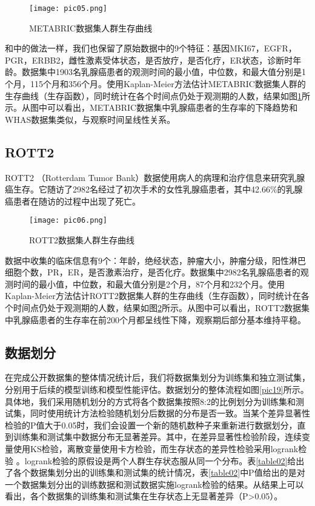 \begin{figure}[H]
\texttt{[image: pic05.png]}
\caption{METABRIC数据集人群生存曲线}
\label{pic05}
\end{figure}

和\cite{Katzman2018DeepSurv}中的做法一样，我们也保留了原始数据中的9个特征：基因MKI67，EGFR，PGR，ERBB2，雌性激素受体状态，是否放疗，是否化疗，ER状态，诊断时年龄。数据集中1903名乳腺癌患者的观测时间的最小值，中位数，和最大值分别是1个月，115个月和356个月。使用Kaplan-Meier方法估计METABRIC数据集人群的生存曲线（生存函数），同时统计在各个时间点仍处于观测期的人数，结果如图\ref{pic05}所示。从图中可以看出，METABRIC数据集中乳腺癌患者的生存率的下降趋势和WHAS数据集类似，与观察时间呈线性关系。

\subsection{ROTT2}

ROTT2 （Rotterdam Tumor Bank）数据使用病人的病理和治疗信息来研究乳腺癌生存。它随访了2982名经过了初次手术的女性乳腺癌患者，其中42.66\%的乳腺癌患者在随访的过程中出现了死亡。

\begin{figure}[H]
\texttt{[image: pic06.png]}
\caption{ROTT2数据集人群生存曲线}
\label{pic06}
\end{figure}

数据中收集的临床信息有9个：年龄，绝经状态，肿瘤大小，肿瘤分级，阳性淋巴细胞个数，PR，ER，是否激素治疗，是否化疗。数据集中2982名乳腺癌患者的观测时间的最小值，中位数，和最大值分别是2个月，87个月和232个月。使用Kaplan-Meier方法估计ROTT2数据集人群的生存曲线（生存函数），同时统计在各个时间点仍处于观测期的人数，结果如图\ref{pic06}所示。从图中可以看出，ROTT2数据集中乳腺癌患者的生存率在前200个月都呈线性下降，观察期后部分基本维持平稳。

\subsection{数据划分}

在完成公开数据集的整体情况统计后，我们将数据集划分为训练集和独立测试集，分别用于后续的模型训练和模型性能评估。数据划分的整体流程如图\ref{pic19}所示。具体地，我们采用随机划分的方式将各个数据集按照8:2的比例划分为训练集和测试集，同时使用统计方法检验随机划分后数据的分布是否一致。当某个差异显著性检验的P值大于0.05时，我们会设置一个新的随机数种子来重新进行数据划分，直到训练集和测试集中数据分布无显著差异。其中，在差异显著性检验阶段，连续变量使用KS检验，离散变量使用卡方检验，而生存状态的差异性检验采用logrank检验 。logrank检验的原假设是两个人群生存状态服从同一个分布。表\ref{table02}给出了各个数据集划分出的训练集和测试集的统计情况，表\ref{table02}中P值给出的是对一个数据集划分出的训练数据和测试数据实施logrank检验的结果。从结果上可以看出，各个数据集的训练集和测试集在生存状态上无显著差异（P>0.05）。

